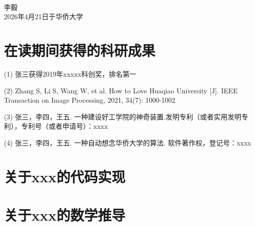 \documentclass[unicode,pdfcover]{hquthesis}
\begin{document}
~\\

\begin{minipage}[t]{0.945\textwidth}%
\begin{flushright}
李毅\\
2026年4月21日于华侨大学%
\par\end{flushright}
\end{minipage}

\setcounter{table}{0}
\setcounter{figure}{0}
\setcounter{equation}{0}
\renewcommand{\theequation}{\textbf{A}-\arabic{equation}}%
\renewcommand{\thetable}{\textbf{A}-\arabic{table}}%
\renewcommand{\thefigure}{\textbf{A}-\arabic{figure}}%
\section{在读期间获得的科研成果}

(1) 张三获得2019年xxxxx科创奖，排名第一

(2) Zhang S, Li S, Wang W, et al. How to Love Huaqiao University [J]. IEEE Transaction on Image Processing, 2021, 34(7): 1000-1002

(3) 张三，李四，王五. 一种建设好工学院的神奇装置.发明专利（或者实用发明专利），专利号（或者申请号）：xxxx

(4) 张三，李四，王五. 一种自动想念华侨大学的算法. 软件著作权，登记号：xxxx

\section{关于xxx的代码实现}


\section{关于xxx的数学推导}

%
\end{document}
